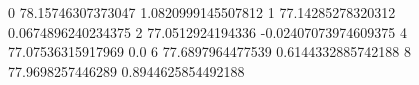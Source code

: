 0 78.15746307373047 1.0820999145507812
1 77.14285278320312 0.0674896240234375
2 77.0512924194336 -0.02407073974609375
4 77.07536315917969 0.0
6 77.6897964477539 0.6144332885742188
8 77.9698257446289 0.8944625854492188
